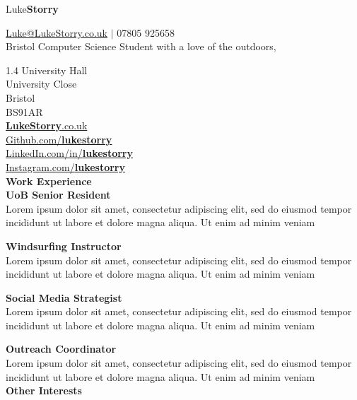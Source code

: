 \documentclass[10pt]{article}
\newcommand{\sect}[1]{{\LARGE{\textbf{#1}}}\vspace{0.1em}\\}
\newcommand{\zz}[3]{{\large\textbf{#1}} \hfill {\small \colorbox{boxcol}{\texttt{#3}} }\\{#2}\vspace{0.5em}}
\begin{document}
\begin{center}
{\Huge{{Luke}\textbf{Storry}}}

{\large \href{mailto:Luke@LukeStorry.co.uk}{Luke@LukeStorry.co.uk} $|$ 07805 925658}\\
Bristol Computer Science Student with a love of the outdoors, 

{\textcolor{linecol}\hrulefill}
\end{center}
\begin{minipage}[t]{0.28\textwidth} 
1.4 University Hall\\University Close\\Bristol\\BS91AR
\vspace{0.5em}\\
\href{https:lukestorry.co.uk}{\textbf{LukeStorry}.co.uk} \\
\href{https://github.com/lukestorry}{Github.com/\textbf{lukestorry}} \\
\href{https://www.linkedin.com/in/lukestorry}{LinkedIn.com/in/\textbf{lukestorry}} \\
\href{https://instagram.com/lukestorry}{Instagram.com/\textbf{lukestorry}}
\\

\sect{Work Experience}
\zz{UoB Senior Resident}{Lorem ipsum dolor sit amet, consectetur adipiscing elit, sed do eiusmod tempor incididunt ut labore et dolore magna aliqua. Ut enim ad minim veniam}{}

\zz{Windsurfing Instructor}{Lorem ipsum dolor sit amet, consectetur adipiscing elit, sed do eiusmod tempor incididunt ut labore et dolore magna aliqua. Ut enim ad minim veniam}{}

\zz{Social Media Strategist}{Lorem ipsum dolor sit amet, consectetur adipiscing elit, sed do eiusmod tempor incididunt ut labore et dolore magna aliqua. Ut enim ad minim veniam}{}

\zz{Outreach Coordinator}{Lorem ipsum dolor sit amet, consectetur adipiscing elit, sed do eiusmod tempor incididunt ut labore et dolore magna aliqua. Ut enim ad minim veniam}{}
\\

\sect{Other Interests}



\end{minipage} 
\hfill
\end{document}

